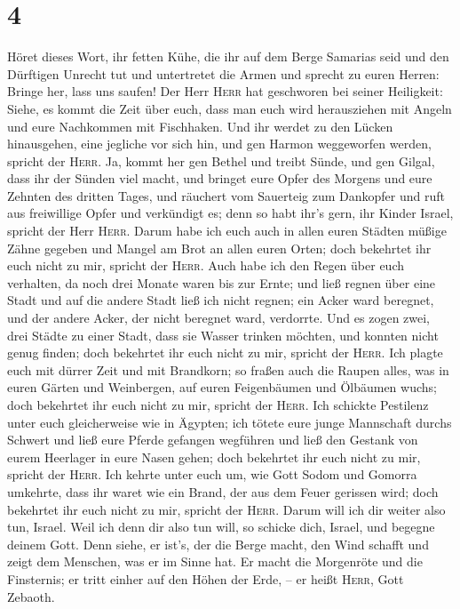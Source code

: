 \hypertarget{section-3}{%
\section{4}\label{section-3}}

 Höret dieses Wort, ihr fetten Kühe, die ihr auf dem Berge
Samarias seid und den Dürftigen Unrecht tut und untertretet die Armen
und sprecht zu euren Herren: Bringe her, lass uns saufen! 
Der Herr \textsc{Herr} hat geschworen bei seiner Heiligkeit: Siehe, es
kommt die Zeit über euch, dass man euch wird herausziehen mit Angeln und
eure Nachkommen mit Fischhaken.  Und ihr werdet zu den
Lücken hinausgehen, eine jegliche vor sich hin, und gen Harmon
weggeworfen werden, spricht der \textsc{Herr}.  Ja, kommt
her gen Bethel und treibt Sünde, und gen Gilgal, dass ihr der Sünden
viel macht, und bringet eure Opfer des Morgens und eure Zehnten des
dritten Tages,  und räuchert vom Sauerteig zum Dankopfer
und ruft aus freiwillige Opfer und verkündigt es; denn so habt ihr's
gern, ihr Kinder Israel, spricht der Herr \textsc{Herr}. 
Darum habe ich euch auch in allen euren Städten müßige Zähne gegeben und
Mangel am Brot an allen euren Orten; doch bekehrtet ihr euch nicht zu
mir, spricht der \textsc{Herr}.  Auch habe ich den Regen
über euch verhalten, da noch drei Monate waren bis zur Ernte; und ließ
regnen über eine Stadt und auf die andere Stadt ließ ich nicht regnen;
ein Acker ward beregnet, und der andere Acker, der nicht beregnet ward,
verdorrte.  Und es zogen zwei, drei Städte zu einer Stadt,
dass sie Wasser trinken möchten, und konnten nicht genug finden; doch
bekehrtet ihr euch nicht zu mir, spricht der \textsc{Herr}.
 Ich plagte euch mit dürrer Zeit und mit Brandkorn; so
fraßen auch die Raupen alles, was in euren Gärten und Weinbergen, auf
euren Feigenbäumen und Ölbäumen wuchs; doch bekehrtet ihr euch nicht zu
mir, spricht der \textsc{Herr}.  Ich schickte Pestilenz
unter euch gleicherweise wie in Ägypten; ich tötete eure junge
Mannschaft durchs Schwert und ließ eure Pferde gefangen wegführen und
ließ den Gestank von eurem Heerlager in eure Nasen gehen; doch bekehrtet
ihr euch nicht zu mir, spricht der \textsc{Herr}.  Ich
kehrte unter euch um, wie Gott Sodom und Gomorra umkehrte, dass ihr
waret wie ein Brand, der aus dem Feuer gerissen wird; doch bekehrtet ihr
euch nicht zu mir, spricht der \textsc{Herr}.  Darum will
ich dir weiter also tun, Israel. Weil ich denn dir also tun will, so
schicke dich, Israel, und begegne deinem Gott.  Denn
siehe, er ist's, der die Berge macht, den Wind schafft und zeigt dem
Menschen, was er im Sinne hat. Er macht die Morgenröte und die
Finsternis; er tritt einher auf den Höhen der Erde, -- er heißt
\textsc{Herr}, Gott Zebaoth.

